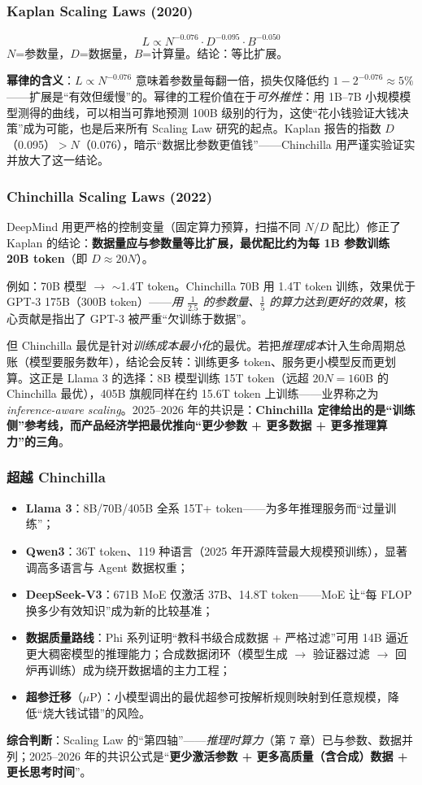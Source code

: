 \documentclass[12pt,a4paper]{article}
\begin{document}
\subsubsection{Kaplan Scaling Laws (2020)}
\[
L \propto N^{-0.076} \cdot D^{-0.095} \cdot B^{-0.050}
\]
$N$=参数量，$D$=数据量，$B$=计算量。结论：等比扩展。

\textbf{幂律的含义}：$L \propto N^{-0.076}$ 意味着参数量每翻一倍，损失仅降低约 $1-2^{-0.076} \approx 5\%$——扩展是“有效但缓慢”的。幂律的工程价值在于\emph{可外推性}：用 1B--7B 小规模模型测得的曲线，可以相当可靠地预测 100B 级别的行为，这使“花小钱验证大钱决策”成为可能，也是后来所有 Scaling Law 研究的起点。Kaplan 报告的指数 $D$（0.095）$> N$（0.076），暗示“数据比参数更值钱”——Chinchilla 用严谨实验证实并放大了这一结论。

\subsubsection{Chinchilla Scaling Laws (2022)}
DeepMind 用更严格的控制变量（固定算力预算，扫描不同 $N/D$ 配比）修正了 Kaplan 的结论：\textbf{数据量应与参数量等比扩展，最优配比约为每 1B 参数训练 20B token}（即 $D \approx 20N$）。

例如：70B 模型 $\to$ $\sim$1.4T token。Chinchilla 70B 用 1.4T token 训练，效果优于 GPT-3 175B（300B token）——\emph{用 $\frac{1}{2.5}$ 的参数量、$\frac{1}{5}$ 的算力达到更好的效果}，核心贡献是指出了 GPT-3 被严重“欠训练于数据”。

但 Chinchilla 最优是针对\emph{训练成本最小化}的最优。若把\emph{推理成本}计入生命周期总账（模型要服务数年），结论会反转：训练更多 token、服务更小模型反而更划算。这正是 Llama 3 的选择：8B 模型训练 15T token（远超 $20N=160$B 的 Chinchilla 最优），405B 旗舰同样在约 15.6T token 上训练——业界称之为\emph{inference-aware scaling}。2025--2026 年的共识是：\textbf{Chinchilla 定律给出的是“训练侧”参考线，而产品经济学把最优推向“更少参数 + 更多数据 + 更多推理算力”的三角}。

\subsubsection{超越 Chinchilla}

\begin{itemize}
  \item \textbf{Llama 3}：8B/70B/405B 全系 15T+ token——为多年推理服务而“过量训练”；
  \item \textbf{Qwen3}：36T token、119 种语言（2025 年开源阵营最大规模预训练），显著调高多语言与 Agent 数据权重；
  \item \textbf{DeepSeek-V3}：671B MoE 仅激活 37B、14.8T token——MoE 让“每 FLOP 换多少有效知识”成为新的比较基准；
  \item \textbf{数据质量路线}：Phi 系列证明“教科书级合成数据 + 严格过滤”可用 14B 逼近更大稠密模型的推理能力；合成数据闭环（模型生成 $\to$ 验证器过滤 $\to$ 回炉再训练）成为绕开数据墙的主力工程；
  \item \textbf{超参迁移}（$\mu$P）：小模型调出的最优超参可按解析规则映射到任意规模，降低“烧大钱试错”的风险。
\end{itemize}
\textbf{综合判断}：Scaling Law 的“第四轴”——\emph{推理时算力}（第 7 章）已与参数、数据并列；2025--2026 年的共识公式是“\textbf{更少激活参数 + 更多高质量（含合成）数据 + 更长思考时间}”。
\end{document}

